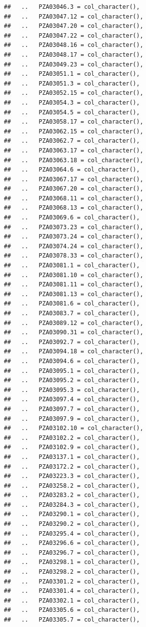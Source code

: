 \documentclass[
]{article}
\begin{document}
\begin{verbatim}
##   ..   PZA03046.3 = col_character(),
##   ..   PZA03047.12 = col_character(),
##   ..   PZA03047.20 = col_character(),
##   ..   PZA03047.22 = col_character(),
##   ..   PZA03048.16 = col_character(),
##   ..   PZA03048.17 = col_character(),
##   ..   PZA03049.23 = col_character(),
##   ..   PZA03051.1 = col_character(),
##   ..   PZA03051.3 = col_character(),
##   ..   PZA03052.15 = col_character(),
##   ..   PZA03054.3 = col_character(),
##   ..   PZA03054.5 = col_character(),
##   ..   PZA03058.17 = col_character(),
##   ..   PZA03062.15 = col_character(),
##   ..   PZA03062.7 = col_character(),
##   ..   PZA03063.17 = col_character(),
##   ..   PZA03063.18 = col_character(),
##   ..   PZA03064.6 = col_character(),
##   ..   PZA03067.17 = col_character(),
##   ..   PZA03067.20 = col_character(),
##   ..   PZA03068.11 = col_character(),
##   ..   PZA03068.13 = col_character(),
##   ..   PZA03069.6 = col_character(),
##   ..   PZA03073.23 = col_character(),
##   ..   PZA03073.24 = col_character(),
##   ..   PZA03074.24 = col_character(),
##   ..   PZA03078.33 = col_character(),
##   ..   PZA03081.1 = col_character(),
##   ..   PZA03081.10 = col_character(),
##   ..   PZA03081.11 = col_character(),
##   ..   PZA03081.13 = col_character(),
##   ..   PZA03081.6 = col_character(),
##   ..   PZA03083.7 = col_character(),
##   ..   PZA03089.12 = col_character(),
##   ..   PZA03090.31 = col_character(),
##   ..   PZA03092.7 = col_character(),
##   ..   PZA03094.18 = col_character(),
##   ..   PZA03094.6 = col_character(),
##   ..   PZA03095.1 = col_character(),
##   ..   PZA03095.2 = col_character(),
##   ..   PZA03095.3 = col_character(),
##   ..   PZA03097.4 = col_character(),
##   ..   PZA03097.7 = col_character(),
##   ..   PZA03097.9 = col_character(),
##   ..   PZA03102.10 = col_character(),
##   ..   PZA03102.2 = col_character(),
##   ..   PZA03102.9 = col_character(),
##   ..   PZA03137.1 = col_character(),
##   ..   PZA03172.2 = col_character(),
##   ..   PZA03223.3 = col_character(),
##   ..   PZA03258.2 = col_character(),
##   ..   PZA03283.2 = col_character(),
##   ..   PZA03284.3 = col_character(),
##   ..   PZA03290.1 = col_character(),
##   ..   PZA03290.2 = col_character(),
##   ..   PZA03295.4 = col_character(),
##   ..   PZA03296.6 = col_character(),
##   ..   PZA03296.7 = col_character(),
##   ..   PZA03298.1 = col_character(),
##   ..   PZA03298.2 = col_character(),
##   ..   PZA03301.2 = col_character(),
##   ..   PZA03301.4 = col_character(),
##   ..   PZA03302.1 = col_character(),
##   ..   PZA03305.6 = col_character(),
##   ..   PZA03305.7 = col_character(),

\end{verbatim}
\end{document}

